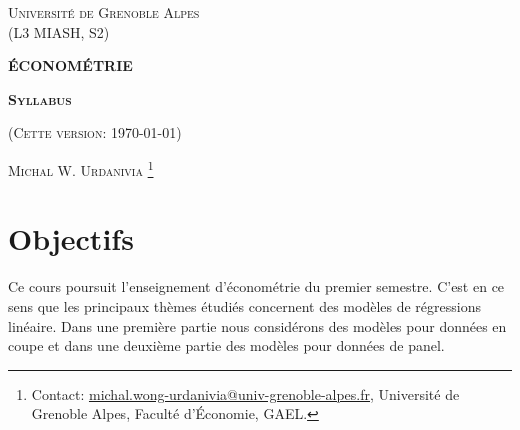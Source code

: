 \documentclass[10pt, reqno]{amsart}
\begin{document}
 
\usetikzlibrary{positioning}
\usetikzlibrary{snakes}
\usetikzlibrary{calc}
\usetikzlibrary{arrows}
\usetikzlibrary{decorations.markings}
\usetikzlibrary{shapes.misc}
\usetikzlibrary{shapes}

%

\begin{titlepage}
\centering
	{\scshape\Large \textsc{Université de Grenoble Alpes\\(L3 MIASH, S2)}\par}
	\vspace{0.5cm}
	{\Large\bfseries \scshape\Large \textsc{ÉCONOMÉTRIE}\par}
	\vspace{0.5cm}
	{\Large\bfseries \textsc{Syllabus} \par}
    \vspace{0.5cm}   
	{(\textsc{Cette version: \today})\par}
	\vspace{1cm}
	{\large \textsc{Michal W. Urdanivia}
	\footnote{Contact:  
	\href{mailto:michal.wong-urdanivia@univ-grenoble-alpes.fr}{michal.wong-urdanivia@univ-grenoble-alpes.fr}, 
	 Université de Grenoble Alpes,  Faculté d'\'Economie, GAEL.}\par}
	
\end{titlepage}


\newpage

\tableofcontents

\newpage

\section{Objectifs}

 Ce cours poursuit l'enseignement d'économétrie du premier semestre. C'est en ce sens que les principaux 
 thèmes étudiés concernent des modèles de régressions linéaire. Dans une première partie nous considérons 
 des modèles pour données en coupe et dans une deuxième partie des modèles pour données de panel.
\end{document}

